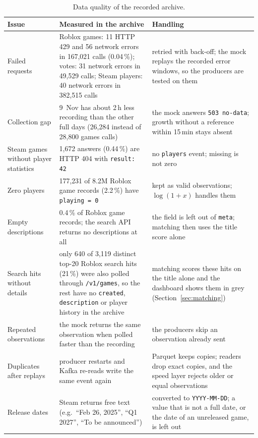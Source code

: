 \documentclass[10pt,a4paper]{article}
\newcommand{\ep}[1]{\texttt{\small #1}}
\begin{document}
\begin{table}[H]
\centering\small
\begin{tabularx}{\textwidth}{L{3.6cm} Y L{5.2cm}}
\toprule
\textbf{Issue} & \textbf{Measured in the archive} & \textbf{Handling}\\
\midrule
Failed requests & Roblox games: 11 HTTP 429 and 56 network errors in 167,021 calls (0.04\,\%); votes: 31 network errors in 49,529 calls; Steam players: 40 network errors in 382,515 calls & retried with back-off; the mock replays the recorded error windows, so the producers are tested on them\\
Collection gap & 9~Nov has about 2\,h less recording than the other full days (26,284 instead of 28,800 games calls) & the mock answers \ep{503 no-data}; growth without a reference within 15\,min stays absent\\
Steam games without player statistics & 1,672 answers (0.44\,\%) are HTTP 404 with \ep{result: 42} & no \ep{players} event; missing is not zero\\
Zero players & 177,231 of 8.2M Roblox game records (2.2\,\%) have \ep{playing = 0} & kept as valid observations; $\log(1+x)$ handles them\\
Empty descriptions & 0.4\,\% of Roblox game records; the search API returns no descriptions at all & the field is left out of \ep{meta}; matching then uses the title score alone\\
Search hits without details & only 640 of 3,119 distinct top-20 Roblox search hits (21\,\%) were also polled through \ep{/v1/games}, so the rest have no \ep{created}, \ep{description} or player history in the archive & matching scores these hits on the title alone and the dashboard shows them in grey (Section~\ref{sec:matching})\\
Repeated observations & the mock returns the same observation when polled faster than the recording & the producers skip an observation already sent\\
Duplicates after replays & producer restarts and Kafka re-reads write the same event again & Parquet keeps copies; readers drop exact copies, and the speed layer rejects older or equal observations\\
Release dates & Steam returns free text (e.g.\ ``Feb 26, 2025'', ``Q1 2027'', ``To be announced'') & converted to \ep{YYYY-MM-DD}; a value that is not a full date, or the date of an unreleased game, is left out\\
\bottomrule
\end{tabularx}
\caption{Data quality of the recorded archive.}
\label{tab:quality}
\end{table}
\end{document}
